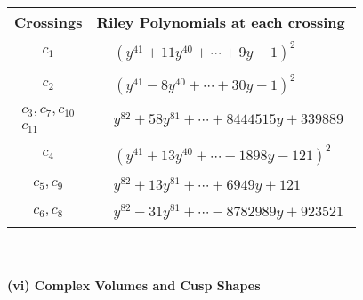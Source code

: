 \documentclass[1p]{elsarticle_modified}
\theoremstyle{definition}
\begin{document}
\begin{tabular}{m{50pt}|m{274pt}}
Crossings & \hspace{64pt}Riley Polynomials at each crossing \\
\hline $$\begin{aligned}c_{1}\end{aligned}$$&$\begin{aligned}
&(y^{41}+11 y^{40}+\cdots+9 y-1)^{2}
\end{aligned}$\\
\hline $$\begin{aligned}c_{2}\end{aligned}$$&$\begin{aligned}
&(y^{41}-8 y^{40}+\cdots+30 y-1)^{2}
\end{aligned}$\\
\hline $$\begin{aligned}c_{3},c_{7},c_{10}\\c_{11}\end{aligned}$$&$\begin{aligned}
&y^{82}+58 y^{81}+\cdots+8444515 y+339889
\end{aligned}$\\
\hline $$\begin{aligned}c_{4}\end{aligned}$$&$\begin{aligned}
&(y^{41}+13 y^{40}+\cdots-1898 y-121)^{2}
\end{aligned}$\\
\hline $$\begin{aligned}c_{5},c_{9}\end{aligned}$$&$\begin{aligned}
&y^{82}+13 y^{81}+\cdots+6949 y+121
\end{aligned}$\\
\hline $$\begin{aligned}c_{6},c_{8}\end{aligned}$$&$\begin{aligned}
&y^{82}-31 y^{81}+\cdots-8782989 y+923521
\end{aligned}$\\
\hline
\end{tabular}\\~\\
\newpage\flushleft \textbf{(vi) Complex Volumes and Cusp Shapes}
\end{document}
